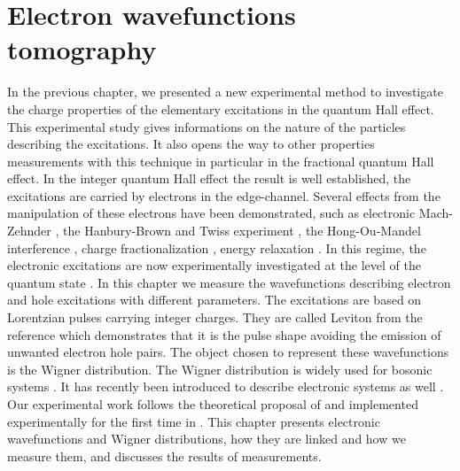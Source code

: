 

\chapter{Electron wavefunctions tomography}

In the previous chapter, we presented a new experimental method to investigate the charge properties of the elementary excitations in the quantum Hall effect.
This experimental study gives informations on the nature of the particles describing the excitations.
It also opens the way to other properties measurements with this technique in particular in the fractional quantum Hall effect.
In the integer quantum Hall effect the result is well established, the excitations are carried by electrons in the edge-channel.
Several effects from the manipulation of these electrons have been demonstrated, such as electronic Mach-Zehnder \cite{ji2003electronic,roulleau2007finite,litvin2007decoherence}, the Hanbury-Brown and Twiss experiment \cite{parmentier2010short,bocquillon2012electron,henny1999fermionic,oliver1999hanbury}, the Hong-Ou-Mandel interference \cite{bocquillon2013}, charge fractionalization \cite{bocquillon2013separation,freulon2015hong,hashisaka2017waveform,inoue2014charge}, energy relaxation \cite{le2010energy,marguerite2016decoherence,rodriguez2019strong,krahenmann2019auger}.
In this regime, the electronic excitations are now experimentally investigated at the level of the quantum state \cite{jullien2014quantum,marguerite2017extracting,santin2017quantum,fletcher2019quantum,freise2019full}.
In this chapter we measure the wavefunctions describing electron and hole excitations with different parameters.
The excitations are based on Lorentzian pulses carrying integer charges.
They are called Leviton from the reference \cite{levitov1996electro} which demonstrates that it is the pulse shape avoiding the emission of unwanted electron hole pairs.
The object chosen to represent these wavefunctions is the Wigner distribution.
The Wigner distribution is widely used for bosonic systems \cite{smithey1993measurement,lvovsky2009continuous,haroche2006exploring}.
It has recently been introduced to describe electronic systems as well \cite{ferraro2013wigner}.
Our experimental work follows the theoretical proposal of \cite{grenier2011single} and implemented experimentally for the first time in \cite{marguerite2017two}.
This chapter presents electronic wavefunctions and Wigner distributions, how they are linked and how we measure them, and discusses the results of measurements.

